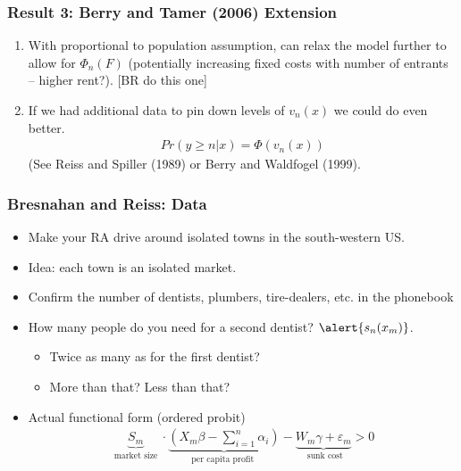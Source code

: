\begin{frame}
\frametitle{Result 3: Berry and Tamer (2006) Extension}
\begin{enumerate}
\item With proportional to population assumption, can relax the model further to allow for $\Phi_n(F)$ (potentially increasing fixed costs with number of entrants -- higher rent?). [BR do this one]
\item If we had additional data to pin down levels of $v_n(x)$ we could do even better.
\begin{eqnarray*}
Pr(y \geq n | x) = \Phi(v_n(x))
\end{eqnarray*}
(See Reiss and Spiller (1989) or Berry and Waldfogel (1999).
\end{enumerate}
\end{frame}


\begin{frame}
\frametitle{Bresnahan and Reiss: Data}
\begin{itemize}
\item Make your RA drive around isolated towns in the south-western US.
\item Idea: each town is an isolated market.
\item Confirm the number of dentists, plumbers, tire-dealers, etc. in the phonebook
\item How many people do you need for a second dentist? $\alert{s_n(x_m)}$.
\begin{itemize} 
\item Twice as many as for the first dentist?
\item More than that? Less than that?
\end{itemize}
\item Actual functional form (ordered probit)
\begin{eqnarray*}
\underbrace{S_m}_{\mbox{ market size } }\cdot \underbrace{\left(X_m \beta - \sum_{i=1}^n \alpha_i \right) }_{\mbox {per capita profit }} -\underbrace{ W_m \gamma + \varepsilon_m}_{\mbox { sunk cost}} > 0
\end{eqnarray*}

\end{itemize}
\end{frame}



